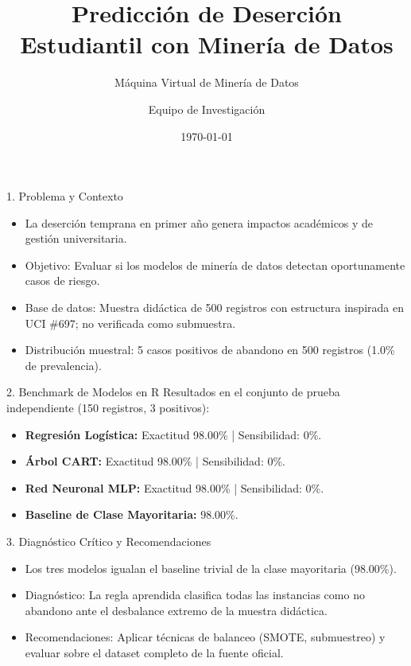 \documentclass{beamer}
\title[Sustentación Proyecto]{Predicción de Deserción Estudiantil con Minería de Datos}
\subtitle{Máquina Virtual de Minería de Datos}
\author{Equipo de Investigación}
\date{\today}
\begin{document}
\begin{frame}
\titlepage
\end{frame}
\begin{frame}{1. Problema y Contexto}
\begin{itemize}
\item La deserción temprana en primer año genera impactos académicos y de gestión universitaria.
\item Objetivo: Evaluar si los modelos de minería de datos detectan oportunamente casos de riesgo.
\item Base de datos: Muestra didáctica de 500 registros con estructura inspirada en UCI \#697; no verificada como submuestra.
\item Distribución muestral: 5 casos positivos de abandono en 500 registros (1.0\% de prevalencia).
\end{itemize}
\end{frame}
\begin{frame}{2. Benchmark de Modelos en R}
Resultados en el conjunto de prueba independiente (150 registros, 3 positivos):
\begin{itemize}
\item \textbf{Regresión Logística:} Exactitud 98.00\% | Sensibilidad: 0\%.
\item \textbf{Árbol CART:} Exactitud 98.00\% | Sensibilidad: 0\%.
\item \textbf{Red Neuronal MLP:} Exactitud 98.00\% | Sensibilidad: 0\%.
\item \textbf{Baseline de Clase Mayoritaria:} 98.00\%.
\end{itemize}
\end{frame}
\begin{frame}{3. Diagnóstico Crítico y Recomendaciones}
\begin{itemize}
\item Los tres modelos igualan el baseline trivial de la clase mayoritaria (98.00\%).
\item Diagnóstico: La regla aprendida clasifica todas las instancias como no abandono ante el desbalance extremo de la muestra didáctica.
\item Recomendaciones: Aplicar técnicas de balanceo (SMOTE, submuestreo) y evaluar sobre el dataset completo de la fuente oficial.
\end{itemize}
\end{frame}
\end{document}
